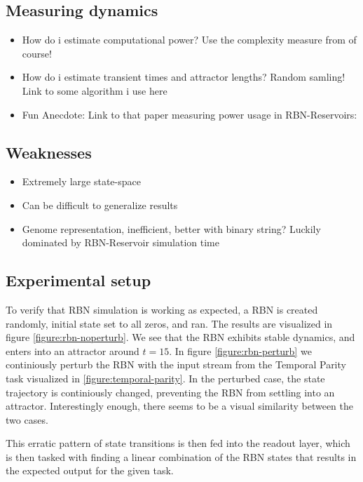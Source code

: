\subsection{Measuring dynamics}

\begin{itemize}
  \item
    How do i estimate computational power?
    Use the complexity measure from \cite{rbn-reservoir} of course!
  \item
    How do i estimate transient times and attractor lengths?
    Random samling! Link to some algorithm i use here
  \item
    Fun Anecdote: Link to that paper measuring power usage in RBN-Reservoirs:
    \cite{rbn-reservoir-energy-efficiency}
\end{itemize}

\subsection{Weaknesses}

\begin{itemize}
  \item Extremely large state-space
  \item Can be difficult to generalize results
  \item
    Genome representation, inefficient, better with binary string?
    Luckily dominated by RBN-Reservoir simulation time
\end{itemize}


\subsection{Experimental setup}

To verify that RBN simulation is working as expected,
a RBN is created randomly, initial state set to all zeros, and ran.
The results are visualized in figure \ref{figure:rbn-noperturb}.
We see that the RBN exhibits stable dynamics, and enters into an attractor around $t=15$.
In figure \ref{figure:rbn-perturb} we continiously perturb the RBN with the input stream from the Temporal Parity task visualized in \ref{figure:temporal-parity}.
In the perturbed case, the state trajectory is continiously changed, preventing the RBN from settling into an attractor.
Interestingly enough, there seems to be a visual similarity between the two cases.

This erratic pattern of state transitions is then fed into the readout layer,
which is then tasked with finding a linear combination of the RBN states that results in the expected output for the given task.

